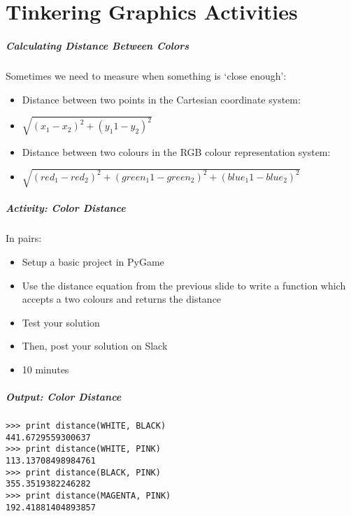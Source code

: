 \part{Tinkering Graphics Activities}
\frame{\partpage}

\begin{frame}
	\frametitle{Calculating Distance Between Colors}
	
	Sometimes we need to measure when something is `close enough':
	
	\begin{itemize}		
		\item Distance between two points in the Cartesian coordinate system:
		\item $\sqrt{(x_{1} - x_{2})^2 + (y_{1}1 - y_{2})^2}$
		\item Distance between two colours in the RGB colour representation system:
		\item $\sqrt{(red_{1} - red_{2})^2 + (green_{1}1 - green_{2})^2 + (blue_{1}1 - blue_{2})^2}$
	\end{itemize}
\end{frame}

\begin{frame}
	\frametitle{Activity: Color Distance}
	
	In pairs:
	
	\vspace{2em}
	
	\begin{itemize}		
		\item Setup a basic project in PyGame
		\item Use the distance equation from the previous slide to write a function which accepts a two colours and returns the distance
		\item Test your solution
		\item Then, post your solution on Slack
		\item 10 minutes
	\end{itemize}
\end{frame}

\begin{frame}[fragile]
	\frametitle{Output: Color Distance}
	
\begin{lstlisting}
>>> print distance(WHITE, BLACK)
441.6729559300637
>>> print distance(WHITE, PINK)
113.13708498984761
>>> print distance(BLACK, PINK)
355.3519382246282
>>> print distance(MAGENTA, PINK)
192.41881404893857
\end{lstlisting}

\end{frame}

